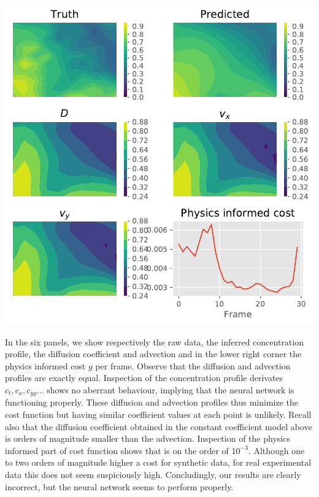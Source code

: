 \documentclass{Dissertate}
\let\origfigure\figure
\let\endorigfigure\endfigure
\renewenvironment{figure}[1][2] {
    \expandafter\origfigure\expandafter[H]
} {
    \endorigfigure
}
\begin{document}
\begin{figure}
\hypertarget{fig:nnfull}{%
\centering
\includegraphics{source/figures/pdf/NN_Man_full.pdf}
\caption{Caption.}\label{fig:nnfull}
}
\end{figure}

In the six panels, we show respectively the raw data, the inferred
concentration profile, the diffusion coefficient and advection and in
the lower right corner the physics informed cost \(g\) per frame.
Observe that the diffusion and advection profiles are exactly equal.
Inspection of the concentration profile derivates
\(c_t, c_x, c_{yy}...\) shows no aberrant behaviour, implying that the
neural network is functioning properly. These diffusion and advection
profiles thus minimize the cost function but having similar coefficient
values at each point is unlikely. Recall also that the diffusion
coefficient obtained in the constant coefficient model above is orders of
magnitude smaller than the advection. Inspection of the physics informed
part of cost function shows that is on the order of \(10^{-3}\).
Although one to two orders of magnitude higher a cost for synthetic data, for
real experimental data this does not seem suspiciously high. Concludingly, our results are clearly incorrect, but the neural network seems to
perform properly. 
\end{document}
